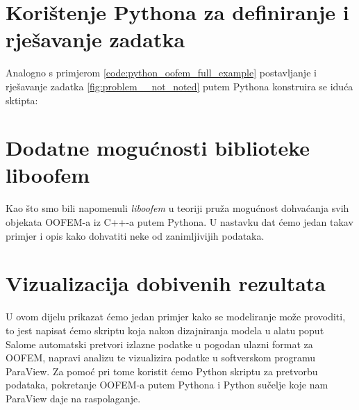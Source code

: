 \documentclass[a4paper,twoside,12pt]{memoir} %
\begin{document}


\section{Korištenje Pythona za definiranje i rješavanje zadatka}
Analogno s primjerom \ref{code:python_oofem_full_example} postavljanje i rješavanje zadatka \ref{fig:problem__not_noted} putem Pythona konstruira se iduća sktipta:




\section{Dodatne mogućnosti biblioteke liboofem}
Kao što smo bili napomenuli \textit{liboofem} u teoriji pruža mogućnost dohvaćanja svih objekata OOFEM-a iz C++-a putem Pythona. U nastavku dat ćemo jedan takav primjer i opis kako dohvatiti neke od zanimljivijih podataka.




\section{Vizualizacija dobivenih rezultata}
U ovom dijelu prikazat ćemo jedan primjer kako se modeliranje može provoditi, to jest napisat ćemo skriptu koja nakon dizajniranja modela u alatu poput Salome automatski pretvori izlazne podatke u pogodan ulazni format za OOFEM, napravi analizu te vizualizira podatke u softverskom programu ParaView. Za pomoć pri tome koristit ćemo Python skriptu za pretvorbu podataka, pokretanje OOFEM-a putem Pythona i Python sučelje koje nam ParaView daje na raspolaganje.


\end{document}
